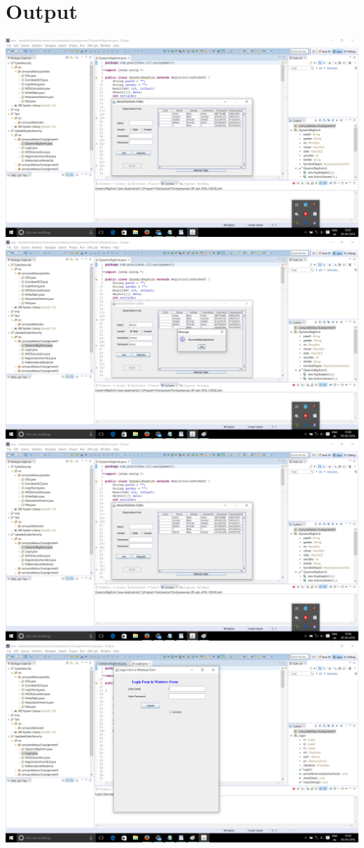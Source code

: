 \documentclass[a4paper,12pt]{article}
\begin{document}
\section{Output}
\includegraphics[width=\textwidth]{1}
\includegraphics[width=\textwidth]{2}
\includegraphics[width=\textwidth]{3}
\includegraphics[width=\textwidth]{4}
\end{document}
